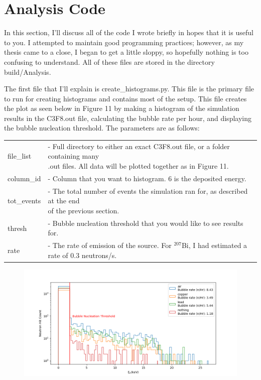 \documentclass[%
12pt,
twoside,
reprint,
amsmath,amssymb,
aps,
]{article}
\begin{document}
	\section{Analysis Code}
	\par In this section, I'll discuss all of the code I wrote briefly in hopes that it is useful to you. I attempted to maintain good programming practices; however, as my thesis came to a close, I began to get a little sloppy, so hopefully nothing is too confusing to understand. All of these files are stored in the directory build/Analysis.
	\par The first file that I'll explain is create\_histograms.py. This file is the primary file to run for creating histograms and contains most of the setup. This file creates the plot as seen below in Figure 11 by making a histogram of the simulation results in the C3F8.out file, calculating the bubble rate per hour, and displaying the bubble nucleation threshold. The parameters are as follows: \\
	
	\begin{table}[!h]
		\begin{tabular}{ll}
			file\_list & \makecell[l]{- Full directory to either an exact C3F8.out file, or a folder containing many \\
				\indent .out files. All data will be plotted together as in Figure 11.}\\
			column\_id & - Column that you want to histogram. 6 is the deposited energy.\\
			tot\_events & \makecell[l]{- The total number of events the simulation ran for, as described at the end \\
				\indent of the previous section.}\\
			thresh & - Bubble nucleation threshold that you would like to see results for.\\
			rate & \makecell[l]{- The rate of emission of the source. For $^{207}$Bi, I had estimated a rate \\
				\indent of 0.3 neutrons/s.}\\
		\end{tabular}
	\end{table}
	
	\begin{figure}[!h]
		\centering
		\includegraphics[scale = 0.65]{Images/particle_guide_log.png}
		\caption{\label{tab:table-name}}
	\end{figure}
\end{document}

